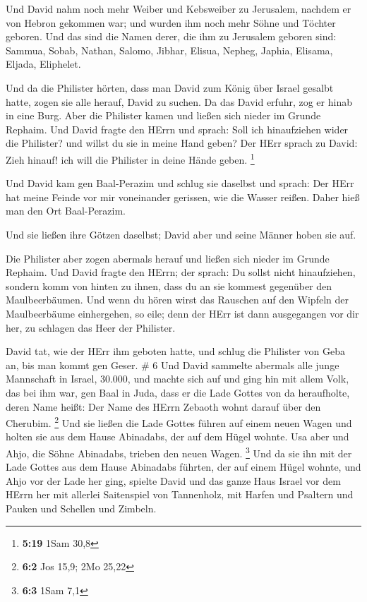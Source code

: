  Und David nahm noch mehr Weiber und Kebsweiber zu
Jerusalem, nachdem er von Hebron gekommen war; und wurden ihm noch mehr
Söhne und Töchter geboren.  Und das sind die Namen derer,
die ihm zu Jerusalem geboren sind: Sammua, Sobab, Nathan, Salomo,
 Jibhar, Elisua, Nepheg, Japhia,  Elisama,
Eljada, Eliphelet.

 Und da die Philister hörten, dass man David zum König über
Israel gesalbt hatte, zogen sie alle herauf, David zu suchen. Da das
David erfuhr, zog er hinab in eine Burg.  Aber die
Philister kamen und ließen sich nieder im Grunde Rephaim. 
Und David fragte den HErrn und sprach: Soll ich hinaufziehen wider die
Philister? und willst du sie in meine Hand geben? Der HErr sprach zu
David: Zieh hinauf! ich will die Philister in deine Hände geben.
\footnote{\textbf{5:19} 1Sam 30,8}

 Und David kam gen Baal-Perazim und schlug sie daselbst und
sprach: Der HErr hat meine Feinde vor mir voneinander gerissen, wie die
Wasser reißen. Daher hieß man den Ort Baal-Perazim.

 Und sie ließen ihre Götzen daselbst; David aber und seine
Männer hoben sie auf.

 Die Philister aber zogen abermals herauf und ließen sich
nieder im Grunde Rephaim.  Und David fragte den HErrn; der
sprach: Du sollst nicht hinaufziehen, sondern komm von hinten zu ihnen,
dass du an sie kommest gegenüber den Maulbeerbäumen.  Und
wenn du hören wirst das Rauschen auf den Wipfeln der Maulbeerbäume
einhergehen, so eile; denn der HErr ist dann ausgegangen vor dir her, zu
schlagen das Heer der Philister.

 David tat, wie der HErr ihm geboten hatte, und schlug die
Philister von Geba an, bis man kommt gen Geser. \# 6  Und
David sammelte abermals alle junge Mannschaft in Israel, 30.000,
 und machte sich auf und ging hin mit allem Volk, das bei
ihm war, gen Baal in Juda, dass er die Lade Gottes von da heraufholte,
deren Name heißt: Der Name des HErrn Zebaoth wohnt darauf über den
Cherubim. \footnote{\textbf{6:2} Jos 15,9; 2Mo 25,22}  Und
sie ließen die Lade Gottes führen auf einem neuen Wagen und holten sie
aus dem Hause Abinadabs, der auf dem Hügel wohnte. Usa aber und Ahjo,
die Söhne Abinadabs, trieben den neuen Wagen. \footnote{\textbf{6:3}
  1Sam 7,1}  Und da sie ihn mit der Lade Gottes aus dem
Hause Abinadabs führten, der auf einem Hügel wohnte, und Ahjo vor der
Lade her ging,  spielte David und das ganze Haus Israel vor
dem HErrn her mit allerlei Saitenspiel von Tannenholz, mit Harfen und
Psaltern und Pauken und Schellen und Zimbeln.

